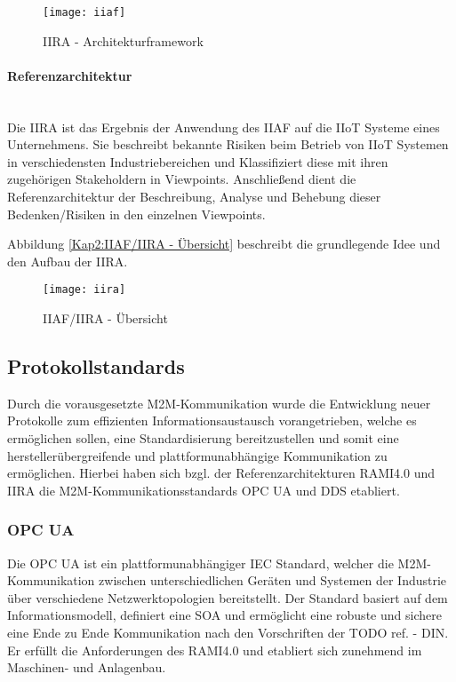 \begin{figure}[h]
  \centering
  \texttt{[image: iiaf]}
  \caption{IIRA - Architekturframework} 
  \label{Kap2:IIRA - Architekturframework}
\end{figure}

\clearpage

\paragraph{Referenzarchitektur}\mbox{}\\
Die \ac{IIRA} ist das Ergebnis der Anwendung des \ac{IIAF} auf die \ac{IIoT} Systeme eines Unternehmens. Sie beschreibt bekannte Risiken beim Betrieb von \ac{IIoT} Systemen in verschiedensten Industriebereichen und Klassifiziert diese mit ihren zugehörigen Stakeholdern in Viewpoints. Anschließend dient die Referenzarchitektur der Beschreibung, Analyse und Behebung dieser Bedenken/Risiken in den einzelnen Viewpoints.

Abbildung \autoref{Kap2:IIAF/IIRA - Übersicht} beschreibt die grundlegende Idee und den Aufbau der \ac{IIRA}.

\begin{figure}[h]
  \centering
  \texttt{[image: iira]}
  \caption{IIAF/IIRA - Übersicht} 
  \label{Kap2:IIAF/IIRA - Übersicht}
\end{figure}

\clearpage

\subsection{Protokollstandards}
Durch die vorausgesetzte M2M-Kommunikation wurde die Entwicklung neuer Protokolle zum effizienten Informationsaustausch vorangetrieben, welche es ermöglichen sollen, eine Standardisierung bereitzustellen und somit eine herstellerübergreifende und plattformunabhängige Kommunikation zu ermöglichen. Hierbei haben sich bzgl. der Referenzarchitekturen \ac{RAMI4.0} und \ac{IIRA} die \ac{M2M}-Kommunikationsstandards \ac{OPC UA} und \ac{DDS} etabliert.

\subsubsection{\ac{OPC UA}}
Die \ac{OPC UA} ist ein plattformunabhängiger \ac{IEC} Standard, welcher die \ac{M2M}-Kommunikation zwischen unterschiedlichen Geräten und Systemen der Industrie über verschiedene Netzwerktopologien bereitstellt. Der Standard basiert auf dem Informationsmodell, definiert eine \ac{SOA} und ermöglicht eine robuste und sichere eine Ende zu Ende Kommunikation nach den Vorschriften der TODO ref. - DIN. Er erfüllt die Anforderungen des \ac{RAMI4.0} und etabliert sich zunehmend im Maschinen- und Anlagenbau.

